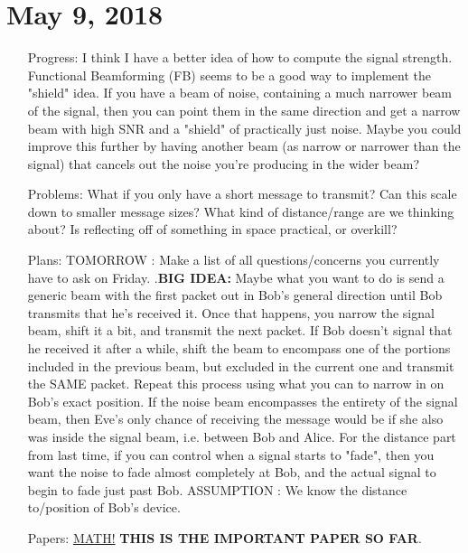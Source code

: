 \documentclass[11pt]{article}
\newcommand{\bigidea}{.\newline\textbf{BIG IDEA:}\newline}
\begin{document}
\section{May 9, 2018}

\begin{itemize}
\item[Progress:]
I think I have a better idea of how to compute the signal strength.  Functional Beamforming (FB) seems to be a good way to implement the "shield" idea.  If you have a beam of noise, containing a much narrower beam of the signal, then you can point them in the same direction and get a narrow beam with high SNR and a "shield" of practically just noise.  Maybe you could improve this further by having another beam (as narrow or narrower than the signal) that cancels out the noise you're producing in the wider beam?

\item[Problems:]
What if you only have a short message to transmit?  Can this scale down to smaller message sizes?  
What kind of distance/range are we thinking about?  Is reflecting off of something in space practical, or overkill?

\item[Plans:]
TOMORROW : Make a list of all questions/concerns you currently have to ask on Friday.
\bigidea
Maybe what you want to do is send a generic beam with the first packet out in Bob's general direction until Bob transmits that he's received it.  Once that happens, you narrow the signal beam, shift it a bit, and transmit the next packet.  If Bob doesn't signal that he received it after a while, shift the beam to encompass one of the portions included in the previous beam, but excluded in the current one and transmit the SAME packet.  Repeat this process using what you can to narrow in on Bob's exact position.  If the noise beam encompasses the entirety of the signal beam, then Eve's only chance of receiving the message would be if she also was inside the signal beam, i.e. between Bob and Alice.\newline
For the distance part from last time, if you can control when a signal starts to "fade", then you want the noise to fade almost completely at Bob, and the actual signal to begin to fade just past Bob.\newline
ASSUMPTION : We know the distance to/position of Bob's device.

\item[Papers:]
\href{http://www.bebec.eu/Downloads/BeBeC2014/Papers/BeBeC-2014-01.pdf}{MATH!} \textbf{THIS IS THE IMPORTANT PAPER SO FAR}.

\end{itemize}
\end{document}
